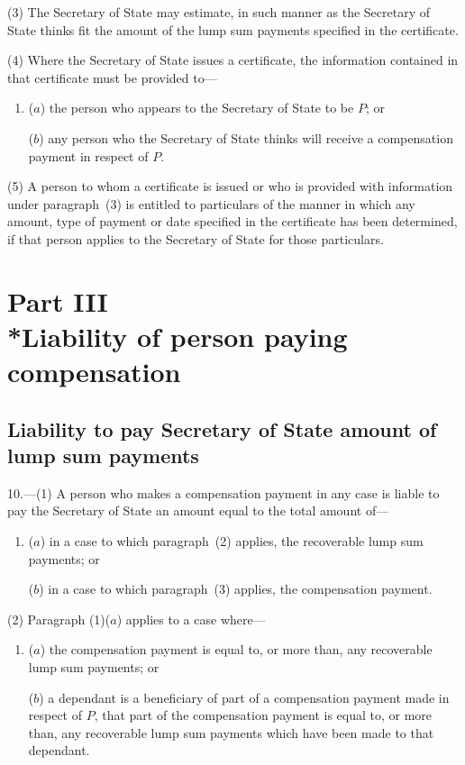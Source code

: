 \documentclass[12pt,a4paper]{article}
\begin{document}
(3) The Secretary of State may estimate, in such manner as the Secretary of State thinks fit the amount of the lump sum payments specified in the certificate.

(4) Where the Secretary of State issues a certificate, the information contained in that certificate must be provided to—
\begin{enumerate}\item[]
($a$) the person who appears to the Secretary of State to be $P$; or

($b$) any person who the Secretary of State thinks will receive a compensation payment in respect of $P$.
\end{enumerate}

(5) A person to whom a certificate is issued or who is provided with information under paragraph~(3) is entitled to particulars of the manner in which any amount, type of payment or date specified in the certificate has been determined, if that person applies to the Secretary of State for those particulars.

\section[Part III --- Liability of person paying compensation]{Part III\\*Liability of person paying compensation}

\renewcommand\parthead{--- Part III}

\subsection[10. Liability to pay Secretary of State amount of lump sum payments]{Liability to pay Secretary of State amount of lump sum payments}

10.---(1)  A person who makes a compensation payment in any case is liable to pay the Secretary of State an amount equal to the total amount of—
\begin{enumerate}\item[]
($a$) in a case to which paragraph~(2) applies, the recoverable lump sum payments; or

($b$) in a case to which paragraph~(3) applies, the compensation payment.
\end{enumerate}

(2) Paragraph (1)($a$)  applies to a case where—
\begin{enumerate}\item[]
($a$) the compensation payment is equal to, or more than, any recoverable lump sum payments; or

($b$) a dependant is a beneficiary of part of a compensation payment made in respect of $P$, that part of the compensation payment is equal to, or more than, any recoverable lump sum payments which have been made to that dependant.
\end{enumerate}
\end{document}
